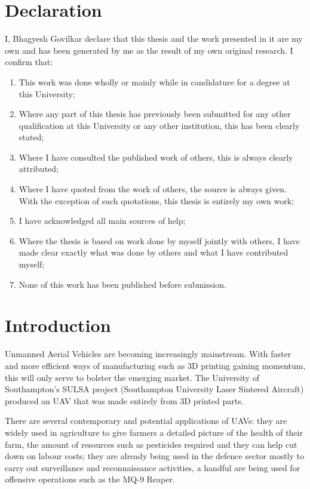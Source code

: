 \documentclass[
11pt, %
english, %
onehalfspacex, %
headsepline, %
] %
{MastersDoctoralThesis}
\begin{document}

\section*{Declaration}
\thispagestyle{fancy}
 I, Bhagyesh Govilkar declare that this thesis and the work presented in it are my own and has
been generated by me as the result of my own original research.
I confirm that:
\begin{enumerate}
\item  This work was done wholly or mainly while in candidature for a degree at this
University;
\item  Where any part of this thesis has previously been submitted for any other
qualification at this University or any other institution, this has been clearly stated;
\item  Where I have consulted the published work of others, this is always clearly
attributed;
\item  Where I have quoted from the work of others, the source is always given. With
the exception of such quotations, this thesis is entirely my own work;
\item  I have acknowledged all main sources of help;
\item  Where the thesis is based on work done by myself jointly with others, I have
made clear exactly what was done by others and what I have contributed myself;
\item  None of this work has been published before submission.
\end{enumerate}
 

\cleardoublepage


\section*{Introduction}
\thispagestyle{fancy}
Unmanned Aerial Vehicles are becoming increasingly mainstream. With faster and more efficient ways of manufacturing such as 3D printing gaining momentum, this will only serve to bolster the emerging market. The University of Southampton's SULSA project (Southampton University Laser Sintered Aircraft) produced an UAV that was made entirely from 3D printed parts. 

There are several contemporary and potential applications of UAVs: they are widely used in agriculture to give farmers a detailed picture of the health of their farm, the amount of resources such as pesticides required and they can help cut down on labour costs; they are already being used in the defence sector mostly to carry out surveillance and reconnaissance activities, a handful are being used for offensive operations such as the MQ-9 Reaper. 
\end{document}
